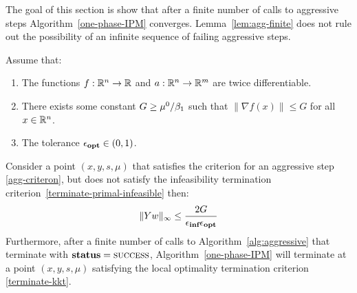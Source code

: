 \documentclass{article}
\begin{document}
The goal of this section is show that after a finite number of calls to aggressive steps Algorithm~\ref{one-phase-IPM} converges.
Lemma~\ref{lem:agg-finite} does not rule out the possibility of an infinite sequence of failing aggressive steps.  

\begin{lemma}\label{lem:agg-finite}
Assume that:
\begin{enumerate}
\item The functions $f : \mathbb{R}^{n} \rightarrow \mathbb{R}$ and $a : \mathbb{R}^{n} \rightarrow \mathbb{R}^{m}$ are twice differentiable. 
\item There exists some constant $G \ge \mu^{0} / \beta_{1}$ such that $\| \nabla f(x) \| \le G$ for all $x \in \mathbb{R}^{n}$. 
\item The tolerance $\epsilon_{\textbf{opt}} \in (0,1)$.
\end{enumerate}
Consider a point $(x, y, s, \mu)$ that satisfies the criterion for an aggressive step \eqref{agg-criteron}, but does not satisfy the infeasibility termination criterion~\eqref{terminate-primal-infeasible} then:
$$
\| Y w \|_{\infty} \le \frac{2 G}{\epsilon_{\textbf{inf}} \epsilon_{\textbf{opt}}}
$$
Furthermore, after a finite number of calls to Algorithm~\ref{alg:aggressive} that terminate with $\textbf{status} = \textsc{success}$, Algorithm~\ref{one-phase-IPM} will terminate at a point $(x, y, s, \mu)$ satisfying the local optimality termination criterion \eqref{terminate-kkt}. 
\end{lemma}
\end{document}
